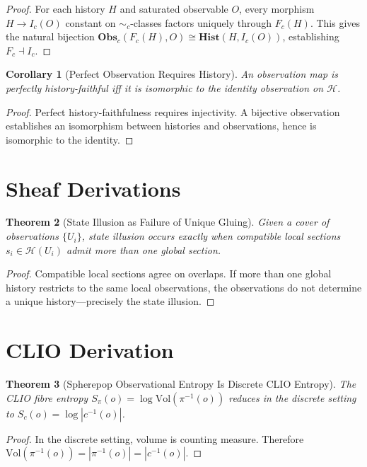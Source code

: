 \documentclass[12pt, a4paper, openany]{book}
\theoremstyle{plain}
\newtheorem{theorem}{Theorem}[chapter]
\newtheorem{corollary}[theorem]{Corollary}
\theoremstyle{definition}
\theoremstyle{remark}
\newcommand{\Hist}{\mathbf{Hist}}
\newcommand{\Obs}{\mathbf{Obs}}
\newcommand{\calH}{\mathcal{H}}
\begin{document}
\begin{proof}
For each history $H$ and saturated observable $O$, every morphism $H \to I_c(O)$
constant on $\sim_c$-classes factors uniquely through $F_c(H)$. This gives the
natural bijection $\Obs_c(F_c(H), O) \cong \Hist(H, I_c(O))$, establishing
$F_c \dashv I_c$.
\end{proof}

\begin{corollary}[Perfect Observation Requires History]
An observation map is perfectly history-faithful iff it is isomorphic to the
identity observation on $\calH$.
\end{corollary}

\begin{proof}
Perfect history-faithfulness requires injectivity. A bijective observation
establishes an isomorphism between histories and observations, hence is isomorphic
to the identity.
\end{proof}

\section{Sheaf Derivations}

\begin{theorem}[State Illusion as Failure of Unique Gluing]
Given a cover of observations $\{U_i\}$, state illusion occurs exactly when
compatible local sections $s_i \in \calH(U_i)$ admit more than one global
section.
\end{theorem}

\begin{proof}
Compatible local sections agree on overlaps. If more than one global history
restricts to the same local observations, the observations do not determine a
unique history---precisely the state illusion.
\end{proof}

\section{CLIO Derivation}

\begin{theorem}[Spherepop Observational Entropy Is Discrete CLIO Entropy]
The CLIO fibre entropy $S_\pi(o) = \log \mathrm{Vol}(\pi^{-1}(o))$ reduces in
the discrete setting to $S_c(o) = \log |c^{-1}(o)|$.
\end{theorem}

\begin{proof}
In the discrete setting, volume is counting measure. Therefore
$\mathrm{Vol}(\pi^{-1}(o)) = |\pi^{-1}(o)| = |c^{-1}(o)|$.
\end{proof}
\end{document}
